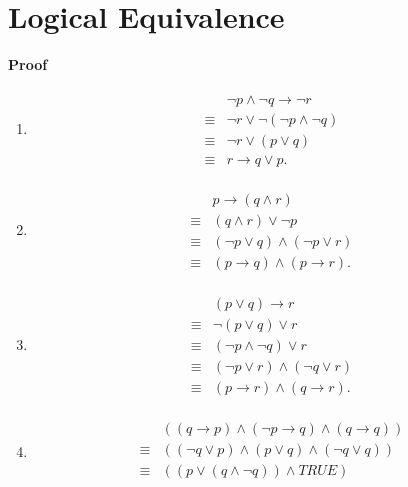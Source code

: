 \documentclass{../../cls/sig-alternate-05-2015}
\begin{document}
\section{Logical Equivalence}
\textbf{Proof}\begin{enumerate}[label=(\alph*)]
    \item \begin{align}
    \begin{aligned}
    & \lnot p \land \lnot q \rightarrow \lnot r\\
    \equiv & \lnot r \lor \lnot (\lnot p \land \lnot q)\\
    \equiv & \lnot r \lor (p \lor q)\\
    \equiv & r \rightarrow q \lor p.
    \end{aligned}
    \end{align}
    \item \begin{align}
        \begin{aligned}
        & p \rightarrow (q \land r)\\
        \equiv & (q \land r) \lor \lnot p\\
        \equiv & (\lnot p \lor q) \land (\lnot p \lor r)\\
        \equiv & (p \rightarrow q) \land (p \rightarrow r).
        \end{aligned}
    \end{align}
    \item \begin{align}
        \begin{aligned}
        & (p \lor q) \rightarrow r\\
        \equiv & \lnot (p \lor q) \lor r\\
        \equiv & (\lnot p \land \lnot q) \lor r\\
        \equiv & (\lnot p \lor r) \land (\lnot q \lor r)\\
        \equiv & (p \rightarrow r) \land (q \rightarrow r).
        \end{aligned}
    \end{align}
    \item \begin{align}
        \begin{aligned}
        & ((q \rightarrow p) \land (\lnot p \rightarrow q) \land (q \rightarrow q))\\
        \equiv & ((\lnot q \lor p) \land (p \lor q) \land (\lnot q \lor q))\\
        \equiv & ((p \lor (q \land \lnot q)) \land TRUE)\\

\end{aligned}
\end{align}
\end{enumerate}
\end{document}
